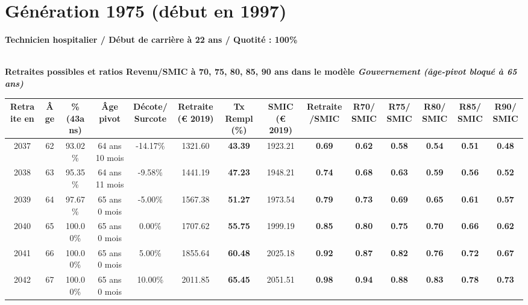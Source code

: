 \section{Génération 1975 (début en 1997)\label{TechHosp_100_1975_22_0}} 
 
{\bf \noindent Technicien hospitalier / Début de carrière à 22 ans / Quotité : 100\%}  ~ 

 ~\\{\bf \noindent Retraites possibles et ratios Revenu/SMIC à 70, 75, 80, 85, 90 ans dans le modèle \emph{Gouvernement (âge-pivot bloqué à 65 ans)}}  
 
\begin{adjustbox}{max width=\textwidth} 
\begin{tabular}[htb]{|c|c||c|c|c||c|c||c|c||c|c|c|c|c|} 
\hline 
 Retraite en &  Âge &  \%(43ans) &  Âge pivot &  Décote/Surcote &  Retraite (\euro{} 2019) &  Tx Rempl(\%) &  SMIC (\euro{} 2019) &  Retraite/SMIC &  R70/SMIC &  R75/SMIC &  R80/SMIC &  R85/SMIC &  R90/SMIC \\ 
\hline \hline 
 2037 &  62 &  93.02\% &  64 ans 10 mois &  -14.17\% &  1321.60 &  {\bf 43.39} &  1923.21 &  {\bf {\color{red} 0.69}} &  {\bf {\color{red} 0.62}} &  {\bf {\color{red} 0.58}} &  {\bf {\color{red} 0.54}} &  {\bf {\color{red} 0.51}} &  {\bf {\color{red} 0.48}} \\ 
\hline 
 2038 &  63 &  95.35\% &  64 ans 11 mois &  -9.58\% &  1441.19 &  {\bf 47.23} &  1948.21 &  {\bf {\color{red} 0.74}} &  {\bf {\color{red} 0.68}} &  {\bf {\color{red} 0.63}} &  {\bf {\color{red} 0.59}} &  {\bf {\color{red} 0.56}} &  {\bf {\color{red} 0.52}} \\ 
\hline 
 2039 &  64 &  97.67\% &  65 ans 0 mois &  -5.00\% &  1567.38 &  {\bf 51.27} &  1973.54 &  {\bf {\color{red} 0.79}} &  {\bf {\color{red} 0.73}} &  {\bf {\color{red} 0.69}} &  {\bf {\color{red} 0.65}} &  {\bf {\color{red} 0.61}} &  {\bf {\color{red} 0.57}} \\ 
\hline 
 2040 &  65 &  100.00\% &  65 ans 0 mois &  0.00\% &  1707.62 &  {\bf 55.75} &  1999.19 &  {\bf {\color{red} 0.85}} &  {\bf {\color{red} 0.80}} &  {\bf {\color{red} 0.75}} &  {\bf {\color{red} 0.70}} &  {\bf {\color{red} 0.66}} &  {\bf {\color{red} 0.62}} \\ 
\hline 
 2041 &  66 &  100.00\% &  65 ans 0 mois &  5.00\% &  1855.64 &  {\bf 60.48} &  2025.18 &  {\bf {\color{red} 0.92}} &  {\bf {\color{red} 0.87}} &  {\bf {\color{red} 0.82}} &  {\bf {\color{red} 0.76}} &  {\bf {\color{red} 0.72}} &  {\bf {\color{red} 0.67}} \\ 
\hline 
 2042 &  67 &  100.00\% &  65 ans 0 mois &  10.00\% &  2011.85 &  {\bf 65.45} &  2051.51 &  {\bf {\color{red} 0.98}} &  {\bf {\color{red} 0.94}} &  {\bf {\color{red} 0.88}} &  {\bf {\color{red} 0.83}} &  {\bf {\color{red} 0.78}} &  {\bf {\color{red} 0.73}} \\ 
\hline 
\hline 
\end{tabular} 
\end{adjustbox} 
 
